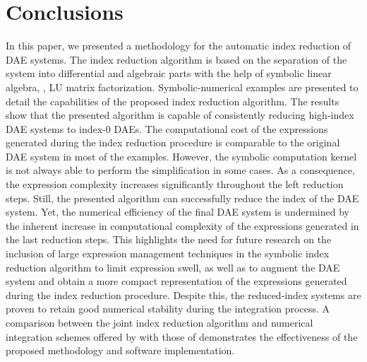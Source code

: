 
\section{Conclusions}
\label{chap6:sec:conclusions}

In this paper, we presented a methodology for the automatic index reduction of \ac{DAE} systems. The index reduction algorithm is based on the separation of the system into differential and algebraic parts with the help of symbolic linear algebra, \ie{}, \ac{LU} matrix factorization. Symbolic-numerical examples are presented to detail the capabilities of the proposed index reduction algorithm. The results show that the presented algorithm is capable of consistently reducing high-index \ac{DAE} systems to index-0 \acp{DAE}. The computational cost of the expressions generated during the index reduction procedure is comparable to the original \ac{DAE} system in most of the examples. However, the \Maple{} symbolic computation kernel is not always able to perform the simplification in some cases. As a consequence, the expression complexity increases significantly throughout the left reduction steps. Still, the presented algorithm can successfully reduce the index of the \ac{DAE} system. Yet, the numerical efficiency of the final \ac{DAE} system is undermined by the inherent increase in computational complexity of the expressions generated in the last reduction steps. This highlights the need for future research on the inclusion of large expression management techniques in the symbolic index reduction algorithm to limit expression swell, as well as to augment the \ac{DAE} system and obtain a more compact representation of the expressions generated during the index reduction procedure. Despite this, the reduced-index systems are proven to retain good numerical stability during the integration process. A comparison between the joint index reduction algorithm and numerical integration schemes offered by \Maple{} with those of \Indigo{} demonstrates the effectiveness of the proposed methodology and software implementation.

